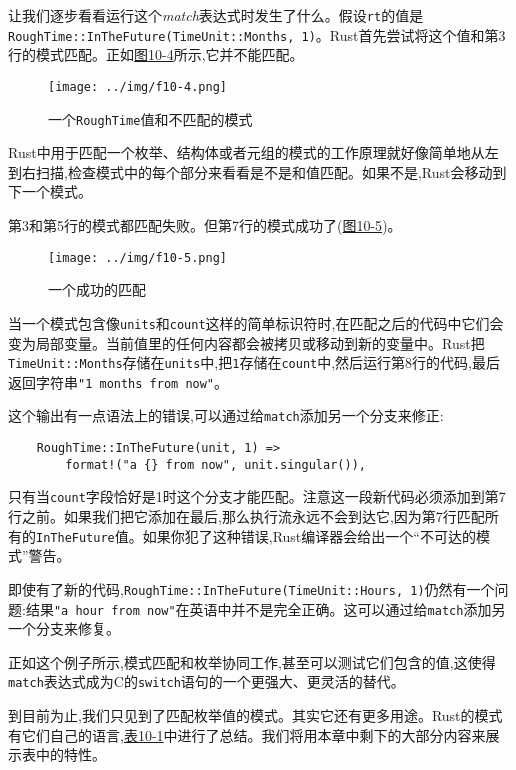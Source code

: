 让我们逐步看看运行这个\emph{match}表达式时发生了什么。假设\texttt{rt}的值是\texttt{RoughTime::InTheFuture(TimeUnit::Months, 1)}。Rust首先尝试将这个值和第3行的模式匹配。正如\hyperref[f10-4]{图10-4}所示,它并不能匹配。

\begin{figure}[htbp]
    \centering
    \texttt{[image: ../img/f10-4.png]}
    \caption{一个\texttt{RoughTime}值和不匹配的模式}
    \label{f10-4}
\end{figure}

Rust中用于匹配一个枚举、结构体或者元组的模式的工作原理就好像简单地从左到右扫描,检查模式中的每个部分来看看是不是和值匹配。如果不是,Rust会移动到下一个模式。

第3和第5行的模式都匹配失败。但第7行的模式成功了(\hyperref[f10-5]{图10-5})。

\begin{figure}[htbp]
    \centering
    \texttt{[image: ../img/f10-5.png]}
    \caption{一个成功的匹配}
    \label{f10-5}
\end{figure}

当一个模式包含像\texttt{units}和\texttt{count}这样的简单标识符时,在匹配之后的代码中它们会变为局部变量。当前值里的任何内容都会被拷贝或移动到新的变量中。Rust把\texttt{TimeUnit::Months}存储在\texttt{units}中,把\texttt{1}存储在\texttt{count}中,然后运行第8行的代码,最后返回字符串\texttt{"1 months from now"}。

这个输出有一点语法上的错误,可以通过给\texttt{match}添加另一个分支来修正:
\begin{verbatim}
    RoughTime::InTheFuture(unit, 1) =>
        format!("a {} from now", unit.singular()),
\end{verbatim}

只有当\texttt{count}字段恰好是1时这个分支才能匹配。注意这一段新代码必须添加到第7行之前。如果我们把它添加在最后,那么执行流永远不会到达它,因为第7行匹配所有的\texttt{InTheFuture}值。如果你犯了这种错误,Rust编译器会给出一个“不可达的模式”警告。

即使有了新的代码,\texttt{RoughTime::InTheFuture(TimeUnit::Hours, 1)}仍然有一个问题:结果\texttt{"a hour from now"}在英语中并不是完全正确。这可以通过给\texttt{match}添加另一个分支来修复。

正如这个例子所示,模式匹配和枚举协同工作,甚至可以测试它们包含的值,这使得\texttt{match}表达式成为C的\texttt{switch}语句的一个更强大、更灵活的替代。

到目前为止,我们只见到了匹配枚举值的模式。其实它还有更多用途。Rust的模式有它们自己的语言,\hyperref[t10-1]{表10-1}中进行了总结。我们将用本章中剩下的大部分内容来展示表中的特性。

